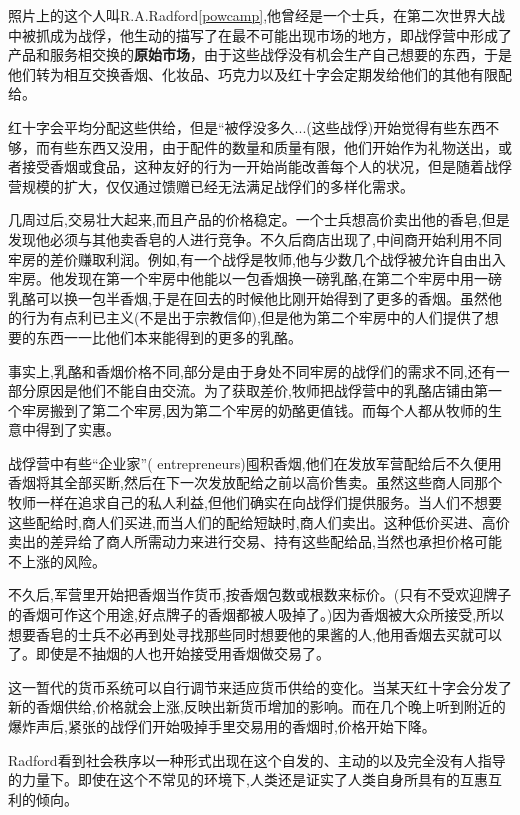 \documentclass[10pt, a4paper]{ctexart} %
\begin{document}
照片上的这个人叫R.A.Radford\ref{powcamp},他曾经是一个士兵，在第二次世界大战中被抓成为战俘，他生动的描写了在最不可能出现市场的地方，即战俘营中形成了产品和服务相交换的\textbf{原始市场}，由于这些战俘没有机会生产自己想要的东西，于是他们转为相互交换香烟、化妆品、巧克力以及红十字会定期发给他们的其他有限配给。
\par
红十字会平均分配这些供给，但是“被俘没多久...(这些战俘)开始觉得有些东西不够，而有些东西又没用，由于配件的数量和质量有限，他们开始作为礼物送出，或者接受香烟或食品，这种友好的行为一开始尚能改善每个人的状况，但是随着战俘营规模的扩大，仅仅通过馈赠已经无法满足战俘们的多样化需求。
\par
几周过后,交易壮大起来,而且产品的价格稳定。一个士兵想高价卖出他的香皂,但是发现他必须与其他卖香皂的人进行竞争。不久后商店出现了,中间商开始利用不同牢房的差价赚取利润。例如,有一个战俘是牧师,他与少数几个战俘被允许自由出入牢房。他发现在第一个牢房中他能以一包香烟换一磅乳酪,在第二个牢房中用一磅乳酪可以换一包半香烟,于是在回去的时候他比刚开始得到了更多的香烟。虽然他的行为有点利已主义(不是出于宗教信仰),但是他为第二个牢房中的人们提供了想要的东西一一比他们本来能得到的更多的乳酪。

事实上,乳酪和香烟价格不同,部分是由于身处不同牢房的战俘们的需求不同,还有一部分原因是他们不能自由交流。为了获取差价,牧师把战俘营中的乳酪店铺由第一个牢房搬到了第二个牢房,因为第二个牢房的奶酪更值钱。而每个人都从牧师的生意中得到了实惠。

战俘营中有些“企业家”( entrepreneurs)囤积香烟,他们在发放军营配给后不久便用香烟将其全部买断,然后在下一次发放配给之前以高价售卖。虽然这些商人同那个牧师一样在追求自己的私人利益,但他们确实在向战俘们提供服务。当人们不想要这些配给时,商人们买进,而当人们的配给短缺时,商人们卖出。这种低价买进、高价卖出的差异给了商人所需动力来进行交易、持有这些配给品,当然也承担价格可能不上涨的风险。

不久后,军营里开始把香烟当作货币,按香烟包数或根数来标价。(只有不受欢迎牌子的香烟可作这个用途,好点牌子的香烟都被人吸掉了。)因为香烟被大众所接受,所以想要香皂的士兵不必再到处寻找那些同时想要他的果酱的人,他用香烟去买就可以了。即使是不抽烟的人也开始接受用香烟做交易了。

这一暂代的货币系统可以自行调节来适应货币供给的变化。当某天红十字会分发了新的香烟供给,价格就会上涨,反映出新货币增加的影响。而在几个晚上听到附近的爆炸声后,紧张的战俘们开始吸掉手里交易用的香烟时,价格开始下降。

Radford看到社会秩序以一种形式出现在这个自发的、主动的以及完全没有人指导的力量下。即使在这个不常见的环境下,人类还是证实了人类自身所具有的互惠互利的倾向。
\end{document}
